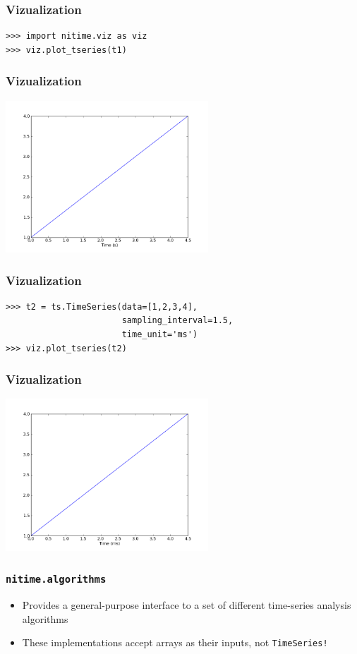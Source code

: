 \documentclass{beamer}
\begin{document}
\begin{frame}[fragile]
\frametitle{Vizualization}
\pause
\begin{lstlisting}
>>> import nitime.viz as viz
>>> viz.plot_tseries(t1)
\end{lstlisting}
\end{frame}

\begin{frame}
\frametitle{Vizualization}
\includegraphics[height=5.7cm]{figures/simple_viz}
\end{frame}

\begin{frame}[fragile]
\frametitle{Vizualization}
\begin{lstlisting}
>>> t2 = ts.TimeSeries(data=[1,2,3,4],
                       sampling_interval=1.5,
                       time_unit='ms')
>>> viz.plot_tseries(t2)
\end{lstlisting}
\end{frame}

\begin{frame}
\frametitle{Vizualization}
\includegraphics[height=5.7cm]{figures/simple_viz2}
\end{frame}

\begin{frame}
\frametitle{\tt{nitime.algorithms}}
\begin{itemize}
\pause
\item
Provides a general-purpose interface to a set of different time-series analysis
algorithms 
\pause
\item
These implementations accept arrays as their inputs, not \tt{TimeSeries}!
\end{itemize}
\end{frame}
\end{document}
